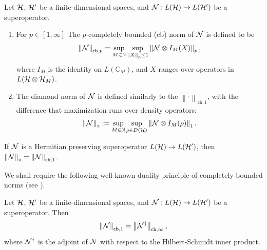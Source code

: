 \documentclass[10pt]{article}
\newcommand{\N}{\mathbb{N}}
\newcommand{\C}{\mathbb{C}}
\newcommand{\norm}[1]{\left\|#1\right\|}
\newcommand{\s}[1]{\mathsf{#1}}
\begin{document}
 \begin{definition}\label{Def:superOpNorms}
Let ${\cal H}$, ${\cal H}'$ be a finite-dimensional spaces, and ${\cal N}:L({\cal H})\to L({\cal H}')$ be a superoperator. 
\begin{enumerate}
    \item For $p\in  [1,\infty]$ The $p$-completely bounded (cb) norm of ${\cal N}$ is defined to be 
    \[\norm{\calN}_{\s{cb},p}=\sup_{M\in \N}\sup_{\norm{X}_p\leq 1}\norm{\calN\otimes I_{M}(X)}_p,\]
    where $I_{M}$ is the identity on $L(\C_M)$, and $X$ ranges over operators in $L({\cal H}\otimes {\cal H}_M)$.
    \item The diamond norm of ${\cal N}$ is defined similarly to the $\norm{\cdot}_{\s{cb},1}$,  with the difference that maximization runs over density operators:
    \[\norm{\calN}_{\diamond}:=\sup_{M\in \N}\sup_{\rho\in D(\calH)}\norm{\calN\otimes I_{M}(\rho)}_1.
    \]
\end{enumerate}
 \end{definition}
\begin{lemma}\label{lem:superoperatorNorms} If ${\cal N}$ is a Hermitian preserving superoperator $L({\cal H})\to L({\cal H}')$, then $\norm{\calN}_{\diamond}=\norm{\calN}_{\s{cb},1}$.
\end{lemma}

 We shall require the following well-known duality principle of completely bounded norms (see \cite[Theorem 1]{Johnston2009Computing}).
     \begin{lemma} \label{lem:Holder duality}
         Let ${\cal H}$, ${\cal H}'$ be a finite-dimensional spaces, and ${\cal N}:L({\cal H})\to L({\cal H}')$ be a superoperator. Then 
         \[\norm{\calN}_{\s{cb},1}=\norm{\calN^\dag}_{\s{cb},\infty},\]
         where ${\cal N}^\dag$ is the adjoint of ${\cal N}$ with respect to the Hilbert-Schmidt inner product. 
     \end{lemma}
\end{document}
